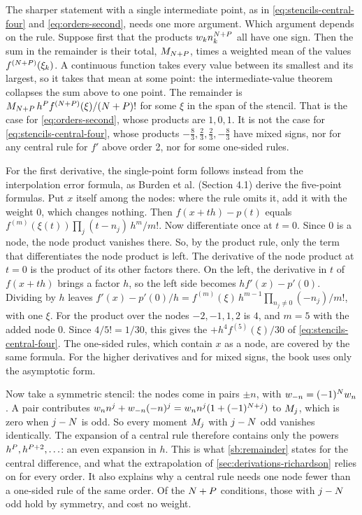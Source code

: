 The sharper statement with a single intermediate point, as in \cref{eq:stencils-central-four} and
\cref{eq:orders-second}, needs one more argument. Which argument depends on the rule. Suppose first that the products
$w_k n_k^{N + P}$ all have one sign. Then the sum in the remainder is their total,
$M_{N + P}$, times a weighted mean of the values $f^{(N + P)}(\xi_k)$. A continuous function
takes every value between its smallest and its largest, so it takes that mean at some point: the intermediate-value
theorem collapses the sum above to one point. The remainder is
$M_{N + P}\, h^{P} f^{(N + P)}(\xi) / (N + P)!$ for some $\xi$ in the span
of the stencil. That is the case for \cref{eq:orders-second}, whose products are $1, 0, 1$. It is not the case for
\cref{eq:stencils-central-four}, whose products $-\tfrac83, \tfrac23, \tfrac23, -\tfrac83$ have mixed signs, nor for
any central rule for $f'$ above order 2, nor for some one-sided rules.

For the first derivative, the single-point form follows instead from the interpolation error formula, as Burden et
al.\cite{burden2016} (Section 4.1) derive the five-point formulas. Put $x$ itself among the nodes: where the rule
omits it, add it with the weight 0, which changes nothing. Then $f(x + th) - p(t)$ equals
$f^{(m)}(\xi(t)) \prod_j (t - n_j)\, h^m / m!$. Now differentiate once at $t = 0$. Since 0 is a node, the node
product vanishes there. So, by the product rule, only the term that differentiates the node product is left. The
derivative of the node product at $t = 0$ is the product of its other factors there. On the left, the derivative in
$t$ of $f(x + th)$ brings a factor $h$, so the left side becomes $h f'(x) - p'(0)$. Dividing by $h$ leaves $f'(x) - p'(0)/h = f^{(m)}(\xi)\, h^{m-1} \prod_{n_j \ne 0} (-n_j) / m!$, with one $\xi$. For
 the product over the nodes $-2, -1, 1, 2$ is $4$, and $m = 5$ with the added node 0. Since
$4 / 5! = 1/30$, this gives the $+ h^4 f^{(5)}(\xi) / 30$ of \cref{eq:stencils-central-four}. The one-sided rules,
which contain $x$ as a node, are covered by the same formula. For the higher derivatives and for mixed signs, the
book uses only the asymptotic form.

Now take a symmetric stencil: the nodes come in pairs $\pm n$, with $w_{-n} = (-1)^{N} w_n$. A pair
contributes $w_n n^j + w_{-n} (-n)^j = w_n n^j (1 + (-1)^{N + j})$ to $M_{j}$, which is zero when
$j - N$ is odd. So every moment $M_{j}$ with $j - N$ odd vanishes identically. The expansion of a
central rule therefore contains only the powers $h^{P}, h^{P + 2}, \ldots$: an even expansion in $h$.
This is what \cref{sb:remainder} states for the central difference, and what the extrapolation of
\cref{sec:derivations-richardson} relies on for every order. It also explains why a central rule needs one node fewer
than a one-sided rule of the same order. Of the $N + P$ conditions, those with $j - N$ odd hold by
symmetry, and cost no weight.

